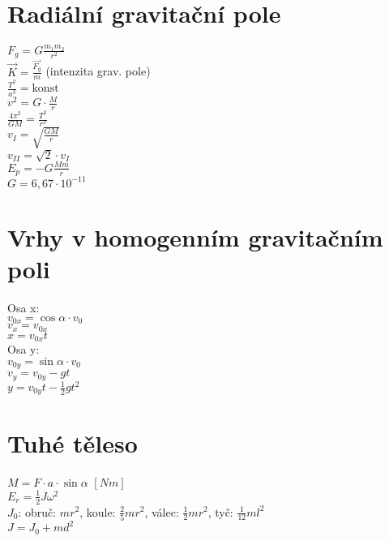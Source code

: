 \documentclass{article}
\begin{document}
\section{Radiální gravitační pole}
\begin{multicols}{2}
\noindent $F_g=G\frac{m_1m_2}{r^2}$\\
$\vec{K}=\frac{\vec{F_g}}{m}$ (intenzita grav. pole)\\
$\frac{T^2}{a^3} = \text{konst}$\\
$v^2=G\cdot \frac{M}{r}$\\
$\frac{4\pi ^2}{GM}=\frac{T^2}{r^3}$\\
$v_I = \sqrt{\frac{GM}{r}}$\\
$v_{II} = \sqrt{2}\cdot v_I$\\
$E_p = -G\frac{Mm}{r}$\\
$G=6,67\cdot 10^{-11}$\\
\end{multicols}

\section{Vrhy v homogenním gravitačním poli}
\begin{multicols}{2}
\noindent Osa x:\\
$v_{0x}=\cos{\alpha}\cdot v_0$\\
$v_x=v_{0x}$\\
$x=v_{0x}t$\\
Osa y:\\
$v_{0y}=\sin{\alpha}\cdot v_0$\\
$v_y=v_{0y}-gt$\\
$y=v_{0y}t-\frac{1}{2}gt^2$
\end{multicols}

\section{Tuhé těleso}
\begin{multicols}{2}
\noindent $M = F \cdot a \cdot \sin{\alpha}$ $[Nm]$\\
$E_r = \frac{1}{2}J\omega ^2$\\
$J_0$: obruč: $mr^2$, koule: $\frac{2}{5}mr^2$, válec: $\frac{1}{2}mr^2$, tyč: $\frac{1}{12}ml^2$\\
$J=J_0+md^2$
\end{multicols}
\pagebreak
\end{document}
